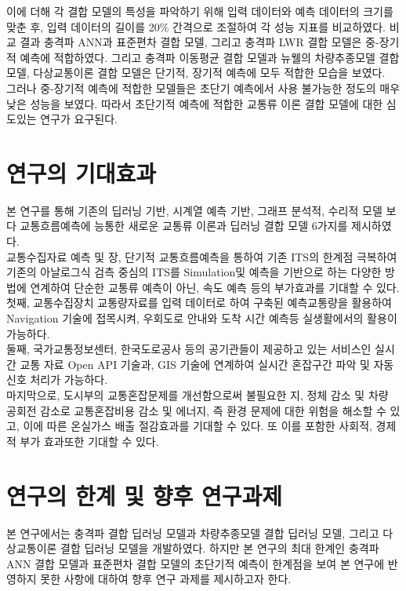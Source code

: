 \documentclass[11pt]{report}
\begin{document}
\indent 이에 더해 각 결합 모델의 특성을 파악하기 위해 입력 데이터와 예측 데이터의 크기를 맞춘 후, 입력 데이터의 길이를 20\% 간격으로 조절하여 각 성능 지표를 비교하였다. 
비교 결과 충격파 ANN과 표준편차 결합 모델, 그리고 충격파 LWR 결합 모델은 중-장기적 예측에 적합하였다. 
그리고 충격파 이동평균 결합 모델과 뉴웰의 차량추종모델 결합 모델, 다상교통이론 결합 모델은 단기적, 장기적 예측에 모두 적합한 모습을 보였다. \\

\indent 그러나 중-장기적 예측에 적합한 모델들은 초단기 예측에서 사용 불가능한 정도의 매우 낮은 성능을 보였다. 
따라서 초단기적 예측에 적합한 교통류 이론 결합 모델에 대한 심도있는 연구가 요구된다. 

\section{연구의 기대효과}
본 연구를 통해 기존의 딥러닝 기반, 시계열 예측 기반, 그래프 분석적, 수리적 모델 보다 교통흐름예측에 능통한 새로운 교통류 이론과 딥러닝 결합 모델 6가지를 제시하였다. \\

\indent 교통수집자료 예측 및 장, 단기적 교통흐름예측을 통하여 기존 ITS의 한계점 극복하여 기존의 아날로그식 검측 중심의 ITS를 Simulation및 예측을 기반으로 하는 다양한 방법에 연계하여 
단순한 교통류 예측이 아닌, 속도 예측 등의 부가효과를 기대할 수 있다. \\

\indent 첫째, 교통수집장치 교통량자료를 입력 데이터로 하여 구축된 예측교통량을 활용하여 Navigation 기술에 접목시켜, 
우회도로 안내와 도착 시간 예측등 실생활에서의 활용이 가능하다. \\

\indent 둘째, 국가교통정보센터, 한국도로공사 등의 공기관들이 제공하고 있는 서비스인 실시간 교통 자료 Open API 기술과, GIS 기술에 연계하여 
실시간 혼잡구간 파악 및 자동 신호 처리가 가능하다. \\

\indent 마지막으로, 도시부의 교통혼잡문제를 개선함으로써 불필요한 지, 정체  감소 및 차량 공회전 감소로 교통혼잡비용 감소 및 에너지, 즉 환경 문제에 대한 위험을 해소할 수 있고, 
이에 따른 온실가스 배출 절감효과를 기대할 수 있다. 
또 이를 포함한 사회적, 경제적 부가 효과또한 기대할 수 있다. 

\section{연구의 한계 및 향후 연구과제}
본 연구에서는 충격파 결합 딥러닝 모델과 차량추종모델 결합 딥러닝 모델, 그리고 다상교통이론 결합 딥러닝 모델을 개발하였다. 
하지만 본 연구의 최대 한계인 충격파 ANN 결합 모델과 표준편차 결합 모델의 초단기적 예측이 한계점을 보여 본 연구에 반영하지 못한 사항에 대하여 향후 연구 과제를 제시하고자 한다. \\
\end{document}
